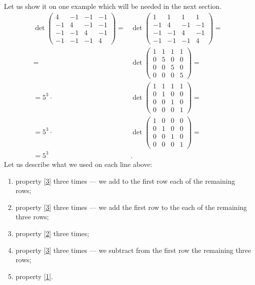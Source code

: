 Let us show it on one example which will be needed in the next section.
\begin{align*}
\det\left(
\begin{matrix}
4&-1&-1&-1
\\
-1&4&-1&-1
\\
-1&-1&4&-1
\\
-1&-1&-1&4
\end{matrix}
\right)
=
&\det\left(
\begin{matrix}
1&1&1&1
\\
-1&4&-1&-1
\\
-1&-1&4&-1
\\
-1&-1&-1&4
\end{matrix}
\right) 
=
\\
=
&\det\left(
\begin{matrix}
1&1&1&1
\\
0&5&0&0
\\
0&0&5&0
\\
0&0&0&5
\end{matrix}
\right)
=
\\
=
5^3\cdot
&\det\left(
\begin{matrix}
1&1&1&1
\\
0&1&0&0
\\
0&0&1&0
\\
0&0&0&1
\end{matrix}
\right)=
\\
=
5^3\cdot&\det\left(
\begin{matrix}
1&0&0&0
\\
0&1&0&0
\\
0&0&1&0
\\
0&0&0&1
\end{matrix}
\right)=
\\
=5^3&.
\end{align*}
Let us describe what we used on each line above:
\begin{enumerate}
\item property \ref{3} three times --- we add to the first row each of the remaining rows;
\item property \ref{3} three times --- we add the first row to the each of the remaining three rows;
\item property \ref{2} three times;
\item property \ref{3} three times --- we subtract from the first row the remaining three rows;
\item property \ref{1}.
\end{enumerate}


